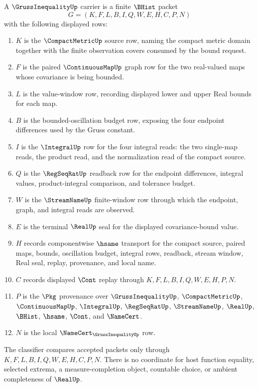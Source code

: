 \begin{definition}
\label{def:gruss-inequality-carrier}
A $\GrussInequalityUp$ carrier is a finite $\BHist$ packet
$$
G=(K,F,L,B,I,Q,W,E,H,C,P,N)
$$
with the following displayed rows:
\begin{enumerate}
\item $K$ is the $\CompactMetricUp$ source row, naming the compact metric domain together with the finite observation covers consumed by the bound request.
\item $F$ is the paired $\ContinuousMapUp$ graph row for the two real-valued maps whose covariance is being bounded.
\item $L$ is the value-window row, recording displayed lower and upper Real bounds for each map.
\item $B$ is the bounded-oscillation budget row, exposing the four endpoint differences used by the Gruss constant.
\item $I$ is the $\IntegralUp$ row for the four integral reads: the two single-map reads, the product read, and the normalization read of the compact source.
\item $Q$ is the $\RegSeqRatUp$ readback row for the endpoint differences, integral values, product-integral comparison, and tolerance budget.
\item $W$ is the $\StreamNameUp$ finite-window row through which the endpoint, graph, and integral reads are observed.
\item $E$ is the terminal $\RealUp$ seal for the displayed covariance-bound value.
\item $H$ records componentwise $\hsame$ transport for the compact source, paired maps, bounds, oscillation budget, integral rows, readback, stream window, Real seal, replay, provenance, and local name.
\item $C$ records displayed $\Cont$ replay through $K,F,L,B,I,Q,W,E,H,P,N$.
\item $P$ is the $\Pkg$ provenance over $\GrussInequalityUp$, $\CompactMetricUp$, $\ContinuousMapUp$, $\IntegralUp$, $\RegSeqRatUp$, $\StreamNameUp$, $\RealUp$, $\BHist$, $\hsame$, $\Cont$, and $\NameCert$.
\item $N$ is the local $\NameCert_{\GrussInequalityUp}$ row.
\end{enumerate}
The classifier compares accepted packets only through $K,F,L,B,I,Q,W,E,H,C,P,N$. There is no coordinate for host function equality, selected extrema, a measure-completion object, countable choice, or ambient completeness of $\RealUp$.
\end{definition}

